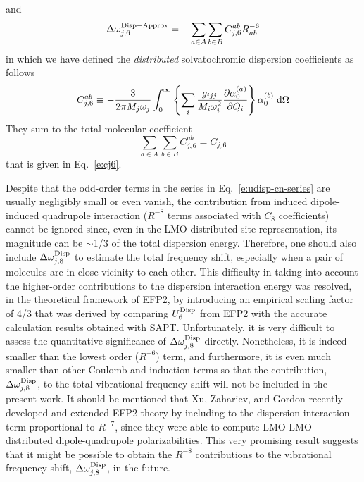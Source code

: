 \documentclass[a4paper,titlepage,twoside,fleqn,12pt]{book}
\begin{document}
\begin{refsection}
%
and 
%
\begin{equation} \label{e:dw-disp-6-iso-approx-distributed}
\Delta \omega_{j,6}^{\rm Disp-Approx} = 
- \sum_{a\in  A}\sum_{b\in B}
C^{ab}_{j,6} R^{-6}_{ab}  
\end{equation}
%
in which we have defined the \emph{distributed} solvatochromic 
dispersion coefficients as follows
%
\begin{equation} \label{e:cj6-distributed}
C^{ab}_{j,6} \equiv -\frac{3}{2\pi M_j\omega_j}
\int_{0}^{\infty} 
\left\{
\sum_i \frac{g_{ijj}}{M_i\omega_i^2} 
\frac{\partial \alpha_0^{(a)}}{\partial Q_i}
\right\}
\alpha_0^{(b)}  \;{\rm d}\Omega  
\end{equation}
%
They sum to the total molecular coefficient
%
\begin{equation}
\sum_{a\in  A}\sum_{b\in B} C^{ab}_{j,6}  =  C_{j,6} 
\end{equation}
%
that is given in Eq.~\eqref{e:cj6}.

Despite that the odd\hyp{}order terms in the series in Eq.~\eqref{e:udisp-cn-series} 
are usually negligibly small or even vanish, the contribution 
from induced dipole\hyp{}induced quadrupole interaction 
($R^{-8}$ terms associated with $C_8$ coefficients) 
cannot be ignored since, even in the LMO\hyp{}distributed 
site representation, its magnitude can be $\sim$1/3 of the total 
dispersion energy. \citep{Adamovic.Gordon.MolPhys.2005} Therefore, one should also include 
$\Delta\omega_{j,8}^{\rm Disp}$ to estimate the total 
frequency shift, especially when a pair of molecules 
are in close vicinity to each other. This difficulty 
in taking into account the higher\hyp{}order contributions 
to the dispersion interaction energy was resolved, in the 
theoretical framework of EFP2, by introducing an empirical 
scaling factor of 4/3 that was derived by comparing 
$U^{\rm Disp}_6$ from EFP2 with the accurate calculation results 
obtained with SAPT. \citep{Jeziorski.Moszynski.Szalewicz.ChemRev.1994,
Adamovic.Gordon.MolPhys.2005} Unfortunately, it is very 
difficult to assess the quantitative significance of 
$\Delta\omega_{j,8}^{\rm Disp}$ directly. Nonetheless, 
it is indeed smaller than the lowest order ($R^{-6}$) term, 
and furthermore, it is even much smaller than other 
Coulomb and induction terms so that the contribution, 
$\Delta\omega_{j,8}^{\rm Disp}$, to the total vibrational 
frequency shift will not be included in the present work. 
It should be mentioned that Xu, Zahariev, and Gordon 
recently developed and extended EFP2 theory by including 
to the dispersion interaction term proportional to $R^{-7}$, 
since they were able to compute LMO\hyp{}LMO distributed 
dipole\hyp{}quadrupole polarizabilities. \citep{Xu.Zahariev.Gordon.JCTC.2014} 
This very promising result suggests that it might be 
possible to obtain the $R^{-8}$ contributions to the 
vibrational frequency shift, $\Delta\omega_{j,8}^{\rm Disp}$, 
in the future.



\end{refsection}
\end{document}
